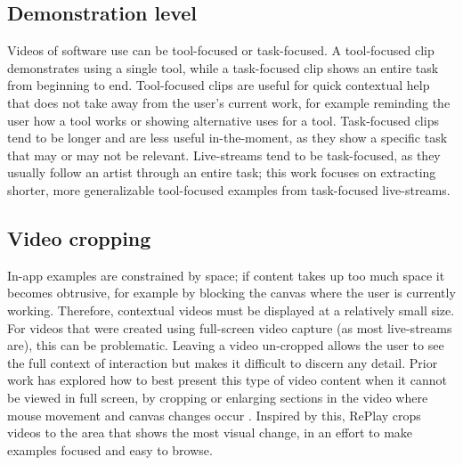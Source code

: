 \subsection{Demonstration level}
Videos of software use can be tool-focused or task-focused. A tool-focused clip demonstrates using a single tool, while a task-focused clip shows an entire task from beginning to end.  Tool-focused clips are useful for quick contextual help that does not take away from the user's current work, for example reminding the user how a tool works \cite{Grossman2010a} or showing alternative uses for a tool.
Task-focused clips tend to be longer and are less useful in-the-moment, as they show a specific task that may or may not be relevant. Live-streams tend to be task-focused, as they usually follow an artist through an entire task; this work focuses on extracting shorter, more generalizable tool-focused examples from task-focused live-streams.



\subsection{Video cropping}
In-app examples are constrained by space; if content takes up too much space it becomes obtrusive, for example by blocking the canvas where the user is currently working. Therefore, contextual videos must be displayed at a relatively small size. For videos that were created using full-screen video capture (as most live-streams are), this can be problematic. Leaving a video un-cropped allows the user to see the full context of interaction but makes it difficult to discern any detail. Prior work has explored how to best present this type of video content when it cannot be viewed in full screen, by cropping or enlarging sections in the video where mouse movement and canvas changes occur \cite{Chi2012}. Inspired by this, RePlay crops videos to the area that shows the most visual change, in an effort to make examples focused and easy to browse.


